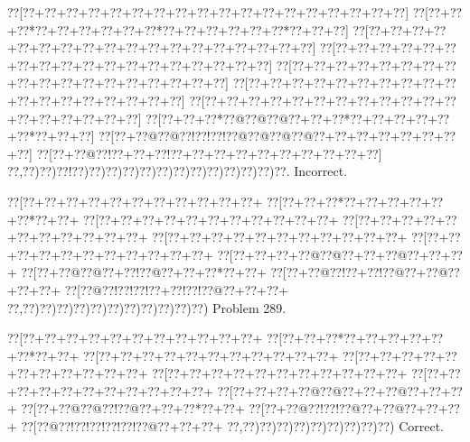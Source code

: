 \documentclass[a5paper]{article}
\begin{document}
\begin{center}
{\goo
\0??[\0??+\0??+\0??+\0??+\0??+\0??+\0??+\0??+\0??+\0??+\0??+\0??+\0??+\0??+\0??+\0??+\0??+\0??]
\0??[\0??+\0??+\0??*\0??+\0??+\0??+\0??+\0??+\0??*\0??+\0??+\0??+\0??+\0??+\0??*\0??+\0??+\0??]
\0??[\0??+\0??+\0??+\0??+\0??+\0??+\0??+\0??+\0??+\0??+\0??+\0??+\0??+\0??+\0??+\0??+\0??+\0??]
\0??[\0??+\0??+\0??+\0??+\0??+\0??+\0??+\0??+\0??+\0??+\0??+\0??+\0??+\0??+\0??+\0??+\0??+\0??]
\0??[\0??+\0??+\0??+\0??+\0??+\0??+\0??+\0??+\0??+\0??+\0??+\0??+\0??+\0??+\0??+\0??+\0??+\0??]
\0??[\0??+\0??+\0??+\0??+\0??+\0??+\0??+\0??+\0??+\0??+\0??+\0??+\0??+\0??+\0??+\0??+\0??+\0??]
\0??[\0??+\0??+\0??+\0??+\0??+\0??+\0??+\0??+\0??+\0??+\0??+\0??+\0??+\0??+\0??+\0??+\0??+\0??]
\0??[\0??+\0??+\0??*\0??@\0??@\0??@\0??+\0??+\0??*\0??+\0??+\0??+\0??+\0??+\0??*\0??+\0??+\0??]
\0??[\0??+\0??@\0??@\0??!\0??!\0??!\0??@\0??@\0??@\0??@\0??+\0??+\0??+\0??+\0??+\0??+\0??+\0??]
\0??[\0??+\0??@\0??!\0??+\0??+\0??!\0??+\0??+\0??+\0??+\0??+\0??+\0??+\0??+\0??+\0??]
\0??,\0??)\0??)\0??!\0??)\0??)\0??)\0??)\0??)\0??)\0??)\0??)\0??)\0??)\0??)\0??)\0??.
}
Incorrect. 

\end{center}
\newpage
\begin{center}
{\goo
\0??[\0??+\0??+\0??+\0??+\0??+\0??+\0??+\0??+\0??+\0??+\0??+
\0??[\0??+\0??+\0??*\0??+\0??+\0??+\0??+\0??+\0??*\0??+\0??+
\0??[\0??+\0??+\0??+\0??+\0??+\0??+\0??+\0??+\0??+\0??+\0??+
\0??[\0??+\0??+\0??+\0??+\0??+\0??+\0??+\0??+\0??+\0??+\0??+
\0??[\0??+\0??+\0??+\0??+\0??+\0??+\0??+\0??+\0??+\0??+\0??+
\0??[\0??+\0??+\0??+\0??+\0??+\0??+\0??+\0??+\0??+\0??+\0??+
\0??[\0??+\0??+\0??+\0??@\0??@\0??+\0??+\0??@\0??+\0??+\0??+
\0??[\0??+\0??@\0??@\0??+\0??!\0??@\0??+\0??+\0??*\0??+\0??+
\0??[\0??+\0??@\0??!\0??+\0??!\0??@\0??+\0??@\0??+\0??+\0??+
\0??[\0??@\0??!\0??!\0??!\0??+\0??!\0??!\0??@\0??+\0??+\0??+
\0??,\0??)\0??)\0??)\0??)\0??)\0??)\0??)\0??)\0??)\0??)\0??)
}
Problem 289.

\end{center}
\begin{center}
{\goo
\0??[\0??+\0??+\0??+\0??+\0??+\0??+\0??+\0??+\0??+\0??+\0??+
\0??[\0??+\0??+\0??*\0??+\0??+\0??+\0??+\0??+\0??*\0??+\0??+
\0??[\0??+\0??+\0??+\0??+\0??+\0??+\0??+\0??+\0??+\0??+\0??+
\0??[\0??+\0??+\0??+\0??+\0??+\0??+\0??+\0??+\0??+\0??+\0??+
\0??[\0??+\0??+\0??+\0??+\0??+\0??+\0??+\0??+\0??+\0??+\0??+
\0??[\0??+\0??+\0??+\0??+\0??+\0??+\0??+\0??+\0??+\0??+\0??+
\0??[\0??+\0??+\0??+\0??@\0??@\0??+\0??+\0??@\0??+\0??+\0??+
\0??[\0??+\0??@\0??@\0??!\0??@\0??+\0??+\0??*\0??+\0??+
\0??[\0??+\0??@\0??!\0??!\0??@\0??+\0??@\0??+\0??+\0??+
\0??[\0??@\0??!\0??!\0??!\0??!\0??!\0??@\0??+\0??+\0??+
\0??,\0??)\0??)\0??)\0??)\0??)\0??)\0??)\0??)\0??)
}
Correct. 

\end{center}
\end{document}
